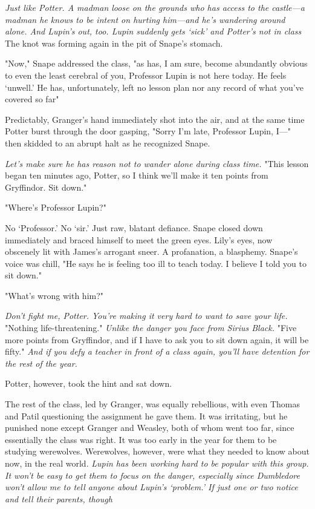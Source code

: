 \emph{Just like Potter. A madman loose on the grounds who has access to the castle—a madman he knows to be intent on hurting him—and he's wandering around alone. And Lupin's out, too. Lupin suddenly gets `sick' and Potter's not in class{\el}} The knot was forming again in the pit of Snape's stomach.

"Now," Snape addressed the class, "as has, I am sure, become abundantly obvious to even the least cerebral of you, Professor Lupin is not here today. He feels `unwell.' He has, unfortunately, left no lesson plan nor any record of what you've covered so far{\el}"

Predictably, Granger's hand immediately shot into the air, and at the same time Potter burst through the door gasping, "Sorry I'm late, Professor Lupin, I—" then skidded to an abrupt halt as he recognized Snape.

\emph{Let's make sure he has reason not to wander alone during class time.} "This lesson began ten minutes ago, Potter, so I think we'll make it ten points from Gryffindor. Sit down."

"Where's Professor Lupin?"

No `Professor.' No `sir.' Just raw, blatant defiance. Snape closed down immediately and braced himself to meet the green eyes. Lily's eyes, now obscenely lit with James's arrogant sneer. A profanation, a blasphemy. Snape's voice was chill, "He says he is feeling too ill to teach today. I believe I told you to sit down."

"What's wrong with him?"

\emph{Don't fight me, Potter. You're making it very hard to want to save your life.} "Nothing life-threatening." \emph{Unlike the danger you face from Sirius Black.} "Five more points from Gryffindor, and if I have to ask you to sit down again, it will be fifty." \emph{And if you defy a teacher in front of a class again, you'll have detention for the rest of the year.}

Potter, however, took the hint and sat down.

The rest of the class, led by Granger, was equally rebellious, with even Thomas and Patil questioning the assignment he gave them. It was irritating, but he punished none except Granger and Weasley, both of whom went too far, since essentially the class was right. It was too early in the year for them to be studying werewolves. Werewolves, however, were what they needed to know about now, in the real world. \emph{Lupin has been working hard to be popular with this group. It won't be easy to get them to focus on the danger, especially since Dumbledore won't allow me to tell anyone about Lupin's `problem.' If just one or two notice and tell their parents, though{\el}}

